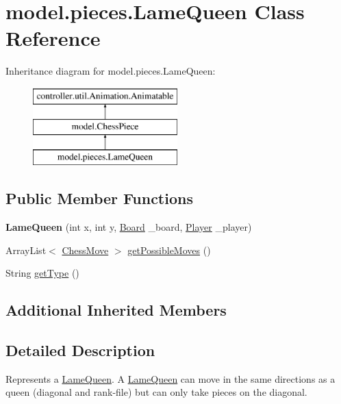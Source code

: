 \hypertarget{classmodel_1_1pieces_1_1_lame_queen}{\section{model.\-pieces.\-Lame\-Queen Class Reference}
\label{classmodel_1_1pieces_1_1_lame_queen}
}
Inheritance diagram for model.\-pieces.\-Lame\-Queen\-:\begin{figure}[H]
\begin{center}
\leavevmode
\includegraphics[height=3.000000cm]{classmodel_1_1pieces_1_1_lame_queen}
\end{center}
\end{figure}
\subsection*{Public Member Functions}
\begin{DoxyCompactItemize}
\item 
\hypertarget{classmodel_1_1pieces_1_1_lame_queen_a64065dd218269348eb40c4fc3ddea36c}{{\bfseries Lame\-Queen} (int x, int y, \hyperlink{classmodel_1_1board_1_1_board}{Board} \-\_\-board, \hyperlink{classcontroller_1_1_player}{Player} \-\_\-player)}\label{classmodel_1_1pieces_1_1_lame_queen_a64065dd218269348eb40c4fc3ddea36c}

\item 
Array\-List$<$ \hyperlink{classmodel_1_1_chess_move}{Chess\-Move} $>$ \hyperlink{classmodel_1_1pieces_1_1_lame_queen_a1c58d7e40397c75344909c305f559f7f}{get\-Possible\-Moves} ()
\item 
String \hyperlink{classmodel_1_1pieces_1_1_lame_queen_a70f4bafe5a2b59a281b4ef23f3e3680f}{get\-Type} ()
\end{DoxyCompactItemize}
\subsection*{Additional Inherited Members}


\subsection{Detailed Description}
Represents a \hyperlink{classmodel_1_1pieces_1_1_lame_queen}{Lame\-Queen}. A \hyperlink{classmodel_1_1pieces_1_1_lame_queen}{Lame\-Queen} can move in the same directions as a queen (diagonal and rank-\/file) but can only take pieces on the diagonal.

